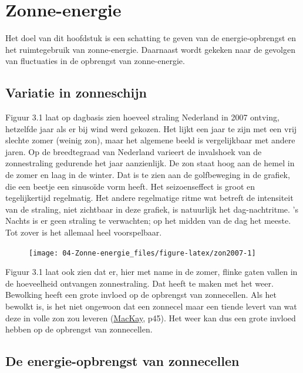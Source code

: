 \documentclass[
  11pt,
  a4paper,
]{book}
\begin{document}
\hypertarget{zonne-energie}{%
\chapter{Zonne-energie}\label{zonne-energie}}

Het doel van dit hoofdstuk is een schatting te geven van de energie-opbrengst en het ruimtegebruik van zonne-energie. Daarnaast wordt gekeken naar de gevolgen van fluctuaties in de opbrengst van zonne-energie.

\hypertarget{variatie-in-zonneschijn}{%
\section{Variatie in zonneschijn}\label{variatie-in-zonneschijn}}

Figuur 3.1 laat op dagbasis zien hoeveel straling Nederland in 2007 ontving, hetzelfde jaar als er bij wind werd gekozen. Het lijkt een jaar te zijn met een vrij slechte zomer (weinig zon), maar het algemene beeld is vergelijkbaar met andere jaren. Op de breedtegraad van Nederland varieert de invalshoek van de zonnestraling gedurende het jaar aanzienlijk. De zon staat hoog aan de hemel in de zomer en laag in de winter. Dat is te zien aan de golfbeweging in de grafiek, die een beetje een sinusoïde vorm heeft. Het seizoenseffect is groot en tegelijkertijd regelmatig. Het andere regelmatige ritme wat betreft de intensiteit van de straling, niet zichtbaar in deze grafiek, is natuurlijk het dag-nachtritme. 's Nachts is er geen straling te verwachten; op het midden van de dag het meeste. Tot zover is het allemaal heel voorspelbaar.

\begin{figure}[!b]

{\centering \texttt{[image: 04-Zonne-energie\_files/figure-latex/zon2007-1]} 

}

\end{figure}

Figuur 3.1 laat ook zien dat er, hier met name in de zomer, flinke gaten vallen in de hoeveelheid ontvangen zonnestraling. Dat heeft te maken met het weer. Bewolking heeft een grote invloed op de opbrengst van zonnecellen. Als het bewolkt is, is het niet ongewoon dat een zonnecel maar een tiende levert van wat deze in volle zon zou leveren (\href{https://www.withouthotair.com/download.html}{MacKay}, p45). Het weer kan dus een grote invloed hebben op de opbrengst van zonnecellen.

\hypertarget{de-energie-opbrengst-van-zonnecellen}{%
\section{De energie-opbrengst van zonnecellen}\label{de-energie-opbrengst-van-zonnecellen}}
\end{document}
